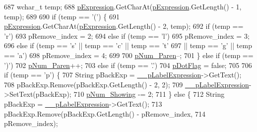 \begin{DoxyCode}
687             \textcolor{keywordtype}{wchar\_t} temp;
688             \hyperlink{_calculator_form_8cpp_a8e641e0c730e6831fcb8e9caf57f5285}{pExpression}.GetCharAt(\hyperlink{_calculator_form_8cpp_a8e641e0c730e6831fcb8e9caf57f5285}{pExpression}.GetLength() - 1, temp);
689 
690             \textcolor{keywordflow}{if} (temp == \textcolor{charliteral}{'('}) \{
691                 \hyperlink{_calculator_form_8cpp_a8e641e0c730e6831fcb8e9caf57f5285}{pExpression}.GetCharAt(\hyperlink{_calculator_form_8cpp_a8e641e0c730e6831fcb8e9caf57f5285}{pExpression}.GetLength() - 2, temp);
692                 \textcolor{keywordflow}{if} (temp == \textcolor{charliteral}{'r'})
693                     pRemove\_index = 2;
694                 \textcolor{keywordflow}{else} \textcolor{keywordflow}{if} (temp == \textcolor{charliteral}{'l'})
695                     pRemove\_index = 3;
696                 \textcolor{keywordflow}{else} \textcolor{keywordflow}{if} (temp == \textcolor{charliteral}{'s'} || temp == \textcolor{charliteral}{'c'} || temp == \textcolor{charliteral}{'t'}
697                         || temp == \textcolor{charliteral}{'g'} || temp == \textcolor{charliteral}{'a'})
698                     pRemove\_index = 4;
699 
700                 \hyperlink{_calculator_form_8cpp_a5a03127e257bb5f5d935e038dcf8d834}{pNum\_Paren}--;
701             \} \textcolor{keywordflow}{else} \textcolor{keywordflow}{if} (temp == \textcolor{charliteral}{')'})
702                 \hyperlink{_calculator_form_8cpp_a5a03127e257bb5f5d935e038dcf8d834}{pNum\_Paren}++;
703             \textcolor{keywordflow}{else} \textcolor{keywordflow}{if} (temp == \textcolor{charliteral}{'.'})
704                 \hyperlink{_calculator_form_8cpp_af728e21ac3463ebc5e7746a542efb32f}{pDotFlag} = \textcolor{keyword}{false};
705 
706             \textcolor{keywordflow}{if} (temp == \textcolor{charliteral}{'p'}) \{
707                 String pBackExp = \hyperlink{class_calculator_form_a85c791f34a8b69e7d22b7d64d7f69bac}{\_\_pLabelExpression}->GetText();
708                 pBackExp.Remove(pBackExp.GetLength() - 2, 2);
709                 \hyperlink{class_calculator_form_a85c791f34a8b69e7d22b7d64d7f69bac}{\_\_pLabelExpression}->SetText(pBackExp);
710                 \hyperlink{_calculator_form_8cpp_afab1dc0f42edf6d2d70e1a3b9a23114b}{pNum\_Showing} -= 2;
711             \} \textcolor{keywordflow}{else} \{
712                 String pBackExp = \hyperlink{class_calculator_form_a85c791f34a8b69e7d22b7d64d7f69bac}{\_\_pLabelExpression}->GetText();
713                 pBackExp.Remove(pBackExp.GetLength() - pRemove\_index,
714                         pRemove\_index);

\end{DoxyCode}

